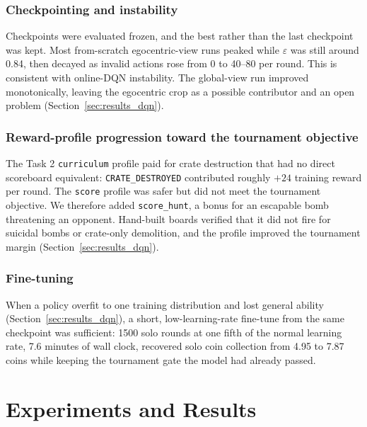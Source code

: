 \documentclass[11pt]{article}
\newcommand{\code}[1]{\texttt{#1}}
\begin{document}
\subsubsection{Checkpointing and instability}

Checkpoints were evaluated frozen, and the best rather than the last checkpoint was kept.
Most from-scratch egocentric-view runs peaked while $\varepsilon$ was still around 0.84,
then decayed as invalid actions rose from 0 to 40--80 per round. This is consistent with
online-DQN instability. The global-view run improved monotonically, leaving the egocentric
crop as a possible contributor and an open problem (Section~\ref{sec:results_dqn}).

\subsubsection{Reward-profile progression toward the tournament objective}

The Task 2 \code{curriculum} profile paid for crate destruction that had no direct scoreboard
equivalent: \code{CRATE\_DESTROYED} contributed roughly $+24$ training reward per round.
The \code{score} profile was safer but did not meet the tournament objective. We therefore
added \code{score\_hunt}, a bonus for an escapable bomb threatening an opponent. Hand-built
boards verified that it did not fire for suicidal bombs or crate-only demolition, and the
profile improved the tournament margin (Section~\ref{sec:results_dqn}).

\subsubsection{Fine-tuning}

When a policy overfit to one training distribution and lost general ability
(Section~\ref{sec:results_dqn}), a short, low-learning-rate fine-tune from the same checkpoint was sufficient: 1500 solo rounds at one fifth of the normal learning rate, 7.6 minutes of wall clock, recovered solo coin collection from 4.95 to 7.87 coins while keeping the tournament gate the model had already passed.

\section{Experiments and Results}
\label{sec:results}
\end{document}
